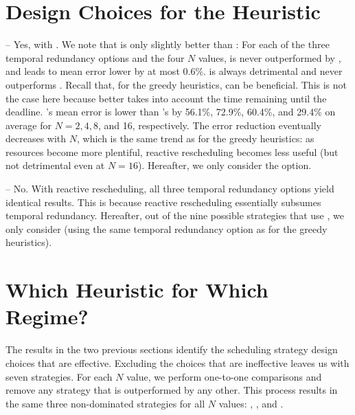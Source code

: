\section{Design Choices for the \dynamic Heuristic}

 --
Yes, with \aggressive. We note that \aggressive is only slightly better than
\variant: For each of the three temporal redundancy options and the four $N$
values, \aggressive is never outperformed by \variant, and leads to mean error
lower by at most 0.6\%. \off is always detrimental and never outperforms
\aggressive. Recall that, for the greedy heuristics, \off can be beneficial.
This is not the case here because \dynamic better takes into account the time
remaining until the deadline.  \aggressive's mean error is lower than
\off's by 56.1\%, 72.9\%, 60.4\%, and 29.4\% on average for $N{=}2, 4,
8$, and 16, respectively. The error reduction eventually decreases with $N$, which is
the same trend as for the greedy heuristics: as resources become more
plentiful, reactive rescheduling becomes less useful (but not detrimental
even at $N{=}16$). Hereafter, we only consider the \aggressive option.

 --
No. With \aggressive reactive rescheduling, all three temporal redundancy
options yield identical results. This is because \aggressive reactive rescheduling
essentially subsumes temporal redundancy. Hereafter, out of the nine possible
strategies that use \dynamic, we only consider 
\strategy{\dynamic}{\dependent}{\aggressive} (using the same
\dependent temporal redundancy option as for the greedy heuristics).

\section{Which Heuristic for Which Regime?}
\label{sec:multihost:regime}

The results in the two previous sections identify the scheduling strategy
design choices that are effective. Excluding the choices that are ineffective
leaves us with seven strategies.
For each $N$ value, we perform one-to-one comparisons
and remove any strategy that is outperformed by any other.
This process results in the same three non-dominated strategies for
all $N$ values:
\strategy{\dynamic}{\dependent}{\aggressive},
\strategy{\foresighted-\errorlevel}{\dependent}{\aggressive}, and
\strategy{\foresighted-\ratio}{\dependent}{\aggressive}.

